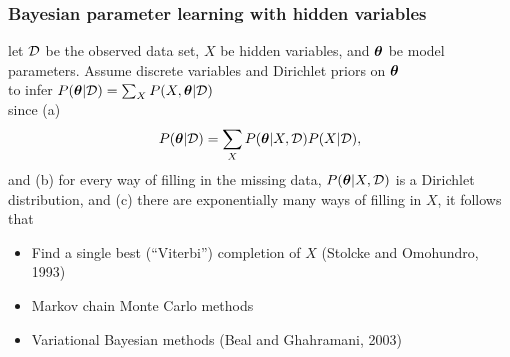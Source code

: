 \begin{frame}
\frametitle{Bayesian parameter learning with hidden variables}

 let $\mathcal{D}$ be the observed data set, $X$ be hidden variables,
and $\boldsymbol{\theta}$ be model parameters. Assume discrete variables and
Dirichlet priors on $\boldsymbol{\theta}$\\[1ex]

 to infer $P(\boldsymbol{\theta}|\mathcal{D}) = \sum_X P(X,\boldsymbol{\theta}|\mathcal{D})$\\[1ex]

 since (a) 
\[
P(\boldsymbol{\theta}|\mathcal{D}) = \sum_X P(\boldsymbol{\theta}|X,\mathcal{D}) P(X|\mathcal{D}),
\]
and (b) for every way of filling in the missing data, $P(\boldsymbol{\theta}|X,\mathcal{D})$ is a
Dirichlet distribution, and (c) there are exponentially many ways of
filling in $X$, it follows that \\[2ex]


\begin{itemize}
\item Find a single best (``Viterbi'') completion of $X$ (Stolcke and
Omohundro, 1993)
\item Markov chain Monte Carlo methods 
\item Variational Bayesian methods (Beal and Ghahramani, 2003)
\end{itemize}

\end{frame}
